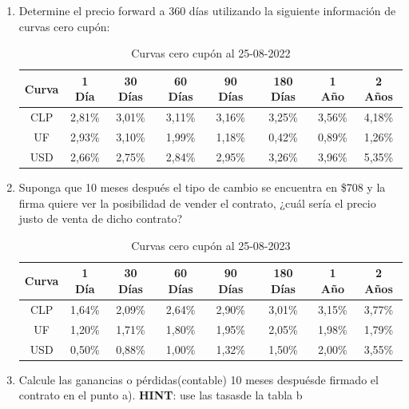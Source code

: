 \documentclass[12pt]{article}
\begin{document}
\begin{enumerate}[label=\textbf{\alph*)}]
\item Determine el precio forward a 360 días utilizando la siguiente información de curvas cero cupón:
\begin{table}[h!]
    \centering
    \caption{Curvas cero cupón al 25-08-2022}
    \begin{tabular}{|c|c|c|c|c|c|c|c|}
    \hline
    \textbf{Curva} & \textbf{1 Día} & \textbf{30 Días} & \textbf{60 Días} & \textbf{90 Días} & \textbf{180 Días} & \textbf{1 Año} & \textbf{2 Años} \\
    \hline
    CLP & 2{,}81\% & 3{,}01\% & 3{,}11\% & 3{,}16\% & 3{,}25\% & 3{,}56\% & 4{,}18\% \\
    UF  & 2{,}93\% & 3{,}10\% & 1{,}99\% & 1{,}18\% & 0{,}42\% & 0{,}89\% & 1{,}26\% \\
    USD & 2{,}66\% & 2{,}75\% & 2{,}84\% & 2{,}95\% & 3{,}26\% & 3{,}96\% & 5{,}35\% \\
    \hline
    \end{tabular}
\end{table}
\item	Suponga que 10 meses después el tipo de cambio se encuentra en \$708 y la firma quiere ver
la posibilidad de vender el contrato, ¿cuál sería el precio justo de venta de dicho contrato?
\begin{table}[h!]
    \centering
    \caption{Curvas cero cupón al 25-08-2023}
    \begin{tabular}{|c|c|c|c|c|c|c|c|}
    \hline
    \textbf{Curva} & \textbf{1 Día} & \textbf{30 Días} & \textbf{60 Días} & \textbf{90 Días} & \textbf{180 Días} & \textbf{1 Año} & \textbf{2 Años} \\
    \hline
    CLP & 1{,}64\% & 2{,}09\% & 2{,}64\% & 2{,}90\% & 3{,}01\% & 3{,}15\% & 3{,}77\% \\
    UF  & 1{,}20\% & 1{,}71\% & 1{,}80\% & 1{,}95\% & 2{,}05\% & 1{,}98\% & 1{,}79\% \\
    USD & 0{,}50\% & 0{,}88\% & 1{,}00\% & 1{,}32\% & 1{,}50\% & 2{,}00\% & 3{,}55\% \\
    \hline
    \end{tabular}
\end{table}
\item Calcule las ganancias o pérdidas(contable) 10 meses despuésde firmado el contrato en el 
    punto a). \textbf{HINT}: use las tasasde la tabla b
\end{enumerate}
\end{document}
